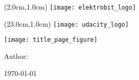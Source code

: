 % 
% 
%



\newlength{\tmpbaselineskip}
\setlength{\tmpbaselineskip}{\baselineskip}
\setlength{\baselineskip}{13.6pt}
\newlength{\tmpparindent}
\setlength{\tmpparindent}{\parindent}
\setlength{\parindent}{17pt}

\thispagestyle{udacitytitlepage}

\begin{textblock*}{20.0cm}(2.0cm,1.0cm) %
	\texttt{[image: elektrobit\_logo]}
\end{textblock*}

\begin{textblock*}{20.0cm}(23.0cm,1.0cm) %
	\texttt{[image: udacity\_logo]}
\end{textblock*}

\begin{center}

\vspace*{3.0cm}

\vspace{-0.2cm}

\vspace{-0.2cm}

\vspace{0.2cm}

\begin{center}
\texttt{[image: title\_page\_figure]}
\end{center}

\end{center}

\begin{center}
\vspace{0.2cm}
{\Large{Author:}}
\vspace{0.2cm}

{\Large{\Author}}

\vspace{1.0cm}
{\normalsize{\today}}
\end{center}

\setlength{\baselineskip}{\tmpbaselineskip}
\setlength{\parindent}{\tmpparindent}

\restoregeometry
